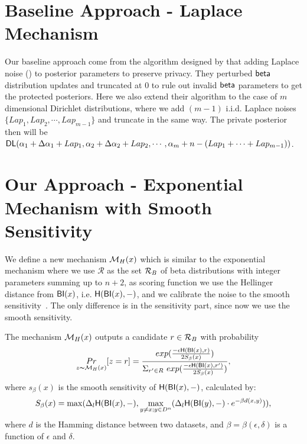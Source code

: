 \documentclass[sigconf, anonymous]{acmart}
\begin{document}
\section{Baseline Approach - Laplace Mechanism}
\label{sec_lap}
Our baseline approach come from the algorithm designed by \citet{zhang2016differential} that adding Laplace noise (\citet{dwork2014algorithmic}) to posterior parameters to preserve privacy. They perturbed $\mathsf{beta}$ distribution updates and truncated at $0$ to rule out invalid $\mathsf{beta}$ parameters to get the protected posteriors. Here we also extend their algorithm to the case of $m$ dimensional Dirichlet distributions, where we add $(m-1)$ i.i.d. Laplace noises $\{Lap_1 , Lap_2, \cdots, Lap_{m-1} \}$ and truncate in the same way. 
The private posterior then will be $\mathsf{DL}(\alpha_1 + \Delta \alpha_1 + Lap_1, \alpha_2 + \Delta \alpha_2 + Lap_2, \cdots, \alpha_m + n - (Lap_1 + \cdots + Lap_{m-1}))$.

\section{Our Approach - Exponential Mechanism with Smooth Sensitivity}
\label{sec_smoo}

We define a new mechanism $\mathcal{M}_H(x)$ which is similar to the exponential mechanism where we use $\mathcal{R}$ as the set $\mathcal{R}_{B}$ of beta distributions with integer parameters summing up to $n+2$, as scoring function we use the Hellinger distance from $\mathsf{BI}(x)$, i.e. $\mathsf{H}(\mathsf{BI}(x),-)$, and we calibrate the noise to the smooth sensitivity~\cite{nissim2007smooth}. The only difference is in the sensitivity part, since now we use the smooth sensitivity.

\begin{definition}
\label{def_smoo}
The mechanism $\mathcal{M}_H(x)$ outputs a candidate $r \in \mathcal{R}_{B}$ with probability
\begin{equation*}
\underset{z \thicksim \mathcal{M}_H(x)}{Pr}[z=r] = \frac
{exp(\frac{-\epsilon\mathsf{H}(\mathsf{BI}(x),r)}{2 S_\beta(x)})}
{\Sigma_{r' \in R}\ exp(\frac{-\epsilon \mathsf{H}(\mathsf{BI}(x),r')}{2 S_\beta(x)})},
\end{equation*}
where $s_\beta(x)$ is the smooth sensitivity of $\mathsf{H}(\mathsf{BI}(x),-)$, calculated by:
\begin{equation*}
S_{\beta}(x) = \max(\Delta_{l}\mathsf{H}(\mathsf{BI}(x),-), \max_{y \neq x; y \in D^{n}}(\Delta_{l}\mathsf{H}(\mathsf{BI}(y),-)\cdot e^{-\beta d(x,y)})),
\end{equation*}
where $d$ is the Hamming distance between two datasets, and $\beta =
\beta(\epsilon, \delta)$ is a function of $\epsilon$ and $\delta$. 
\end{definition}
\end{document}
